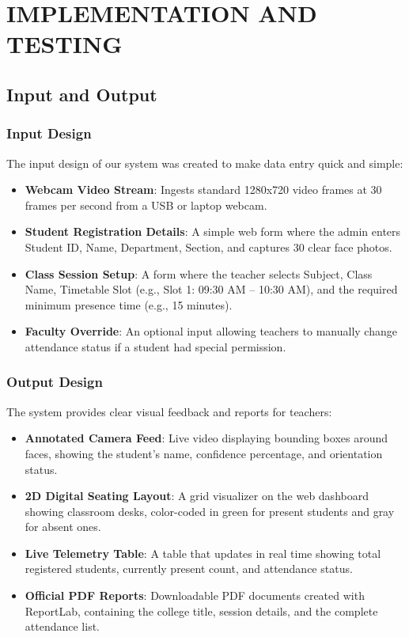 \documentclass[10pt]{report}
\begin{document}
\chapter{IMPLEMENTATION AND TESTING}
\linespread{1.5}

\section{Input and Output}

\subsection{Input Design}
\hspace{0.5cm}The input design of our system was created to make data entry quick and simple:
\begin{itemize}
    \item \textbf{Webcam Video Stream}: Ingests standard 1280x720 video frames at 30 frames per second from a USB or laptop webcam.
    \item \textbf{Student Registration Details}: A simple web form where the admin enters Student ID, Name, Department, Section, and captures 30 clear face photos.
    \item \textbf{Class Session Setup}: A form where the teacher selects Subject, Class Name, Timetable Slot (e.g., Slot 1: 09:30 AM -- 10:30 AM), and the required minimum presence time (e.g., 15 minutes).
    \item \textbf{Faculty Override}: An optional input allowing teachers to manually change attendance status if a student had special permission.
\end{itemize}

\subsection{Output Design}
\hspace{0.5cm}The system provides clear visual feedback and reports for teachers:
\begin{itemize}
    \item \textbf{Annotated Camera Feed}: Live video displaying bounding boxes around faces, showing the student's name, confidence percentage, and orientation status.
    \item \textbf{2D Digital Seating Layout}: A grid visualizer on the web dashboard showing classroom desks, color-coded in green for present students and gray for absent ones.
    \item \textbf{Live Telemetry Table}: A table that updates in real time showing total registered students, currently present count, and attendance status.
    \item \textbf{Official PDF Reports}: Downloadable PDF documents created with ReportLab, containing the college title, session details, and the complete attendance list.
\end{itemize}
\end{document}
